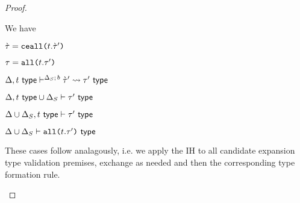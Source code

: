 \begin{proof}
\begin{byCases}
\item[\text{(\ref{rule:cvalidT-U-all})}] We have
\begin{pfsteps*}
  \item $\grave{\tau}=\texttt{ceall}\texttt{(}t.\grave{\tau}'\texttt{)}$ 
  \item $\tau=\texttt{all}\texttt{(}t.\tau'\texttt{)}$ 
  \item $\Delta, t~\mathsf{type}\vdash^{\Delta_S;\,b} \grave{\tau}' \leadsto \tau'~\mathsf{type}$  \label{cvalidT}
  \item ${\Delta, t~\mathsf{type}}\cup{\Delta_S} \vdash \tau'~\mathsf{type}$  
  \item ${\Delta}\cup{\Delta_S}, t~\mathsf{type} \vdash \tau'~\mathsf{type}$  
  \item ${\Delta}\cup{\Delta_S} \vdash \texttt{all}\texttt{(}t.\tau'\texttt{)}~\mathsf{type}$ 
\end{pfsteps*}
\resetpfcounter

\item[{\text{(\ref{rule:istypeU-rec})}}~\text{through}~{\text{(\ref{rule:istypeU-sum})}}] These cases follow analagously, i.e. we apply the IH to all candidate expansion type validation premises, exchange as needed and then the corresponding type formation rule.
\\


\end{byCases}
\end{proof}
